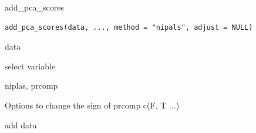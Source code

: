 \documentclass[a4paper]{book}
\begin{document}
%
\begin{Description}
add\_pca\_scores
\end{Description}
%
\begin{Usage}
\begin{verbatim}
add_pca_scores(data, ..., method = "nipals", adjust = NULL)
\end{verbatim}
\end{Usage}
%
\begin{Arguments}
\begin{ldescription}
\item[\code{data}] data

\item[\code{...}] select variable

\item[\code{method}] niplas, prcomp

\item[\code{adjust}] Options to change the sign of prcomp c(F, T ...)
\end{ldescription}
\end{Arguments}
%
\begin{Value}
add data
\end{Value}
%
\end{document}
